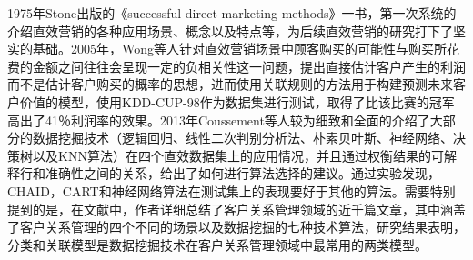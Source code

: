 1975年Stone出版的《successful direct marketing methods》\citep{stone1988successful}一书，第一次系统的介绍直效营销的各种应用场景、概念以及特点等，为后续直效营销的研究打下了坚实的基础。2005年，Wong等人\citep{wong2005mining}针对直效营销场景中顾客购买的可能性与购买所花费的金额之间往往会呈现一定的负相关性这一问题，提出直接估计客户产生的利润而不是估计客户购买的概率的思想，进而使用关联规则的方法用于构建预测未来客户价值的模型，使用KDD-CUP-98作为数据集进行测试，取得了比该比赛的冠军高出了41％利润率的效果。2013年Coussement等人\citep{coussement2015improving}较为细致和全面的介绍了大部分的数据挖掘技术（逻辑回归、线性二次判别分析法、朴素贝叶斯、神经网络、决策树以及KNN算法）在四个直效数据集上的应用情况，并且通过权衡结果的可解释行和准确性之间的关系，给出了如何进行算法选择的建议。通过实验发现，CHAID，CART和神经网络算法在测试集上的表现要好于其他的算法。需要特别提到的是，在文献\citep{ngai2009application}中，作者详细总结了客户关系管理领域的近千篇文章，其中涵盖了客户关系管理的四个不同的场景以及数据挖掘的七种技术算法，研究结果表明，分类和关联模型是数据挖掘技术在客户关系管理领域中最常用的两类模型。




